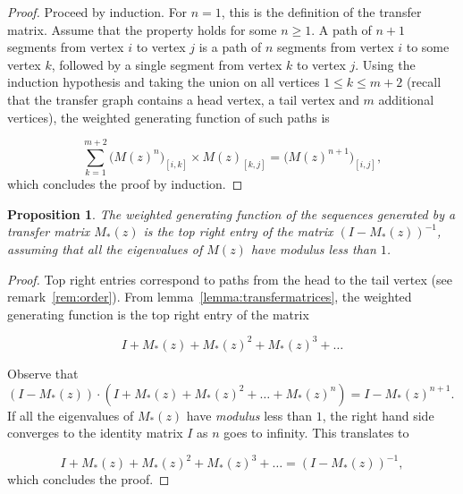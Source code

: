 \documentclass{article}
\newtheorem{proposition}{Proposition}
\begin{document}
\begin{proof}
Proceed by induction. For $n = 1$, this is the definition of the transfer
matrix. Assume that the property holds for some $n \geq 1$. A path of
$n+1$ segments from vertex $i$ to vertex $j$ is a path of $n$ segments
from vertex $i$ to some vertex $k$, followed by a single segment from
vertex $k$ to vertex $j$. Using the induction hypothesis and taking the
union on all vertices $1 \leq k \leq m+2$ (recall that the transfer graph
contains a head vertex, a tail vertex and $m$ additional vertices), the
weighted generating function of such paths is

\begin{equation*}
\sum_{k = 1}^{m+2} \Big(M(z)^n\Big)_{[i,k]} \times M(z)_{[k,j]}
= \Big(M(z)^{n+1}\Big)_{[i,j]},
\end{equation*}
which concludes the proof by induction.
\end{proof}

\begin{proposition}
\label{prop:transfermatrices}
The weighted generating function of the sequences generated by a transfer
matrix $M_*(z)$ is the top right entry of the matrix $(I-M_*(z))^{-1}$,
assuming that all the eigenvalues of $M(z)$ have \textit{modulus} less
than $1$.
\end{proposition}

\begin{proof}
Top right entries correspond to paths from the head to the tail vertex
(see remark~\ref{rem:order}). From lemma~\ref{lemma:transfermatrices}, the
weighted generating function is the top right entry of the matrix

\begin{equation*}
I + M_*(z) + M_*(z)^2 + M_*(z)^3 + \ldots
\end{equation*}

Observe that $(I-M_*(z)) \cdot (I+M_*(z)+M_*(z)^2+ \ldots + M_*(z)^n) =
I-M_*(z)^{n+1}$. If all the eigenvalues of $M_*(z)$ have \textit{modulus}
less than $1$, the right hand side converges to the identity matrix $I$ as
$n$ goes to infinity. This translates to

\begin{equation*}
I + M_*(z) + M_*(z)^2 + M_*(z)^3 + \ldots = (I-M_*(z))^{-1},
\end{equation*}
which concludes the proof.
\end{proof}
\end{document}
